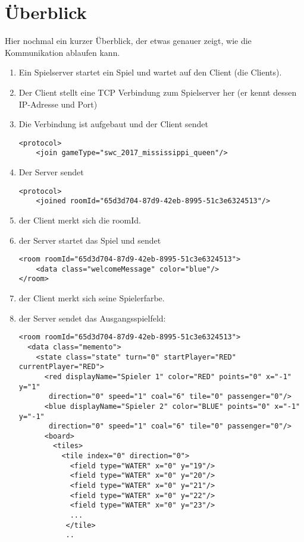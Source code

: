 \documentclass[12pt,a4paper, ngerman, oneside]{scrartcl}
\begin{document}
\newpage
\part{Überblick}
Hier nochmal ein kurzer Überblick, der etwas genauer zeigt, wie die
Kommunikation ablaufen kann.\bigskip\\

\begin{enumerate}
\item Ein Spielserver startet ein Spiel und wartet auf den Client (die Clients).
\item Der Client stellt eine TCP Verbindung zum Spielserver her (er kennt dessen IP-Adresse und Port)
\item Die Verbindung ist aufgebaut und der Client sendet \begin{verbatim}
<protocol>
    <join gameType="swc_2017_mississippi_queen"/>
\end{verbatim}
\item Der Server sendet \begin{verbatim}
<protocol>
    <joined roomId="65d3d704-87d9-42eb-8995-51c3e6324513"/>
\end{verbatim}
\item der Client merkt sich die roomId.
\item der Server startet das Spiel und sendet \begin{verbatim}
<room roomId="65d3d704-87d9-42eb-8995-51c3e6324513">
    <data class="welcomeMessage" color="blue"/>
</room>
\end{verbatim}
\item der Client merkt sich seine Spielerfarbe.
\item der Server sendet das Ausgangsspielfeld: 
\begin{verbatim}
<room roomId="65d3d704-87d9-42eb-8995-51c3e6324513">
  <data class="memento">
    <state class="state" turn="0" startPlayer="RED" currentPlayer="RED">
      <red displayName="Spieler 1" color="RED" points="0" x="-1" y="1"
       direction="0" speed="1" coal="6" tile="0" passenger="0"/>
      <blue displayName="Spieler 2" color="BLUE" points="0" x="-1" y="-1"
       direction="0" speed="1" coal="6" tile="0" passenger="0"/>
      <board>
        <tiles>
          <tile index="0" direction="0">
            <field type="WATER" x="0" y="19"/>
            <field type="WATER" x="0" y="20"/>
            <field type="WATER" x="0" y="21"/>
            <field type="WATER" x="0" y="22"/>
            <field type="WATER" x="0" y="23"/>
            ...
           </tile>
           ..

\end{verbatim}
\end{enumerate}
\end{document}
